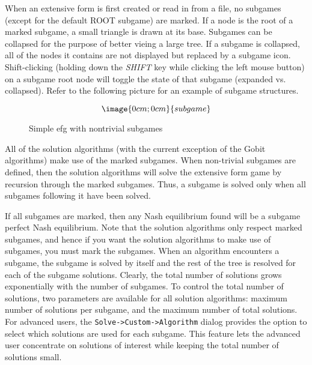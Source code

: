 When an extensive form is first created or 
read in from a file, no subgames (except for the default ROOT subgame) are 
marked.  If a node is the root of a marked subgame, a small triangle is drawn at
its base.  Subgames can be collapsed for the purpose of better vieing a large tree.  
If a subgame is collapsed, all of the nodes it contains are not displayed but 
replaced by a subgame icon.  Shift-clicking
(holding down the {\em SHIFT} key while clicking the left mouse button) on a
subgame root node will toggle the state of that subgame (expanded vs. collapsed).
Refer to the following picture for an example of subgame structures. 


\begin{figure}
$$\image{0cm;0cm}{subgame}$$
\caption{Simple efg with nontrivial subgames}\label{fig_subgames}
\end{figure}

All of the solution algorithms (with the current exception of the 
Gobit algorithms) make use of the marked subgames.  When non-trivial 
subgames are defined, then the solution algorithms will solve the 
extensive form game by recursion through the marked subgames.  Thus, a 
subgame is solved only when all subgames following it have been 
solved.  

If all subgames are marked, then any Nash equilibrium found will be a 
subgame perfect Nash equilibrium.  
Note that the solution algorithms only 
respect marked subgames, and hence if you want the solution 
algorithms to make use of subgames, you must mark the subgames.  
When an algorithm encounters a subgame, the subgame is solved by itself and
the rest of the tree is resolved for each of the subgame solutions.  Clearly,
the total number of solutions grows exponentially with the number of subgames.
To control the total number of solutions, two parameters are available for
all solution algorithms: maximum number of solutions per subgame, and the
maximum number of total solutions. For advanced
users, the {\tt Solve->Custom->Algorithm} dialog provides the option to select
which solutions are used for each subgame.  This feature lets the advanced user
concentrate on solutions of interest while keeping the total number of solutions
small.

